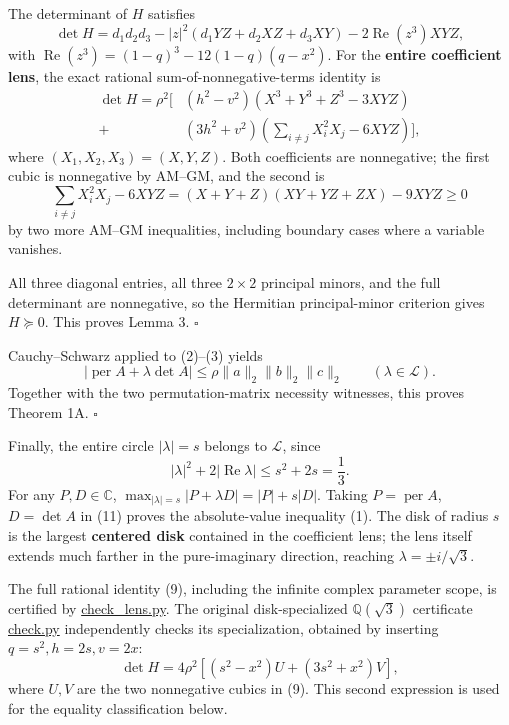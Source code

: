 \documentclass[
  11pt,
]{article}
\begin{document}
The determinant of \(H\) satisfies \[
\det H=d_1d_2d_3-|z|^2(d_1YZ+d_2XZ+d_3XY)
-2\operatorname{Re}(z^3)XYZ,
\tag{8}
\] with \(\operatorname{Re}(z^3)=(1-q)^3-12(1-q)(q-x^2)\). For the
\textbf{entire coefficient lens}, the exact rational
sum-of-nonnegative-terms identity is \[
\boxed{
\begin{aligned}
\det H=\rho^2\bigg[
 &(h^2-v^2)\left(X^3+Y^3+Z^3-3XYZ\right)\\
+&(3h^2+v^2)\left(\sum_{i\ne j}X_i^2X_j-6XYZ\right)
\bigg],
\end{aligned}}
\tag{9}
\] where \((X_1,X_2,X_3)=(X,Y,Z)\). Both coefficients are nonnegative;
the first cubic is nonnegative by AM--GM, and the second is \[
\sum_{i\ne j}X_i^2X_j-6XYZ
=(X+Y+Z)(XY+YZ+ZX)-9XYZ\ge0
\tag{10}
\] by two more AM--GM inequalities, including boundary cases where a
variable vanishes.

All three diagonal entries, all three \(2\times2\) principal minors, and
the full determinant are nonnegative, so the Hermitian principal-minor
criterion gives \(H\succeq0\). This proves Lemma 3. \(\square\)

Cauchy--Schwarz applied to (2)--(3) yields \[
|\operatorname{per}A+\lambda\det A|
\le\rho\|a\|_2\|b\|_2\|c\|_2
\qquad(\lambda\in\mathcal L).
\tag{11}
\] Together with the two permutation-matrix necessity witnesses, this
proves Theorem 1A. \(\square\)

Finally, the entire circle \(|\lambda|=s\) belongs to \(\mathcal L\),
since \[
|\lambda|^2+2|\operatorname{Re}\lambda|
\le s^2+2s=\frac13.
\] For any \(P,D\in\mathbb C\),
\(\max_{|\lambda|=s}|P+\lambda D|=|P|+s|D|\). Taking
\(P=\operatorname{per}A\), \(D=\det A\) in (11) proves the
absolute-value inequality (1). The disk of radius \(s\) is the largest
\textbf{centered disk} contained in the coefficient lens; the lens
itself extends much farther in the pure-imaginary direction, reaching
\(\lambda=\pm i/\sqrt3\).

The full rational identity (9), including the infinite complex parameter
scope, is certified by
\href{../../notes/complex-permanent-determinant/check_lens.py}{check\_lens.py}.
The original disk-specialized \(\mathbb Q(\sqrt3)\) certificate
\href{../../notes/complex-permanent-determinant/check.py}{check.py}
independently checks its specialization, obtained by inserting
\(q=s^2,h=2s,v=2x\): \[
\det H=4\rho^2\left[(s^2-x^2)U+(3s^2+x^2)V\right],
\tag{9a}
\] where \(U,V\) are the two nonnegative cubics in (9). This second
expression is used for the equality classification below.
\end{document}
